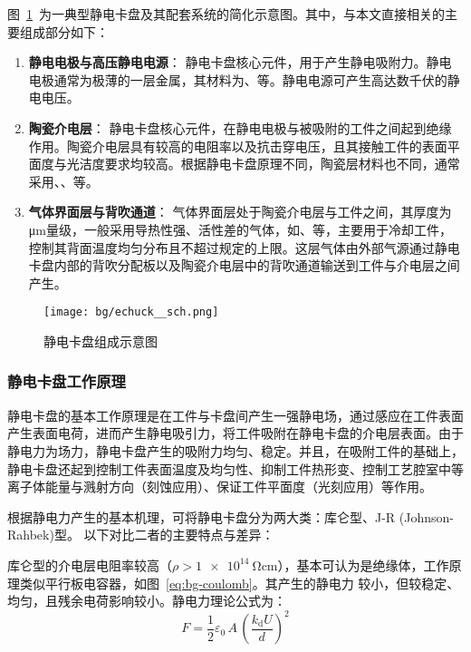 图~\ref{fig:bg-echuck-sch}~为一典型静电卡盘及其配套系统的简化示意图。其中，与本文直接相关的主要组成部分如下：

\begin{enumerate}
  \item \textbf{静电电极与高压静电电源}：
    静电卡盘核心元件，用于产生静电吸附力。静电电极通常为极薄的一层金属，其材料为、等。静电电源可产生高达数千伏的静电电压。
  \item \textbf{陶瓷介电层}：
    静电卡盘核心元件，在静电电极与被吸附的工件之间起到绝缘作用。陶瓷介电层具有较高的电阻率以及抗击穿电压，且其接触工件的表面平面度与光洁度要求均较高。根据静电卡盘原理不同，陶瓷层材料也不同，通常采用、、等。
  \item \textbf{气体界面层与背吹通道}：
    气体界面层处于陶瓷介电层与工件之间，其厚度为\si{\um}量级，一般采用导热性强、活性差的气体，如、等，主要用于冷却工件，控制其背面温度均匀分布且不超过规定的上限。这层气体由外部气源通过静电卡盘内部的背吹分配板以及陶瓷介电层中的背吹通道输送到工件与介电层之间产生。
\end{enumerate}

\begin{figure}[tb]
\centering
\texttt{[image: bg/echuck\_\_sch.png]}
\caption{静电卡盘组成示意图}
\label{fig:bg-echuck-sch}
\end{figure}

\subsubsection{静电卡盘工作原理}\label{sec:bg-bg-chuck-principle}

静电卡盘的基本工作原理是在工件与卡盘间产生一强静电场，通过感应在工件表面产生表面电荷，进而产生静电吸引力，将工件吸附在静电卡盘的介电层表面。由于静电力为场力，静电卡盘产生的吸附力均匀、稳定。并且，在吸附工件的基础上，静电卡盘还起到控制工件表面温度及均匀性、抑制工件热形变、控制工艺腔室中等离子体能量与溅射方向（刻蚀应用）、保证工件平面度（光刻应用）等作用。

根据静电力产生的基本机理，可将静电卡盘分为两大类：库仑型、\mbox{J-R} (Johnson-Rahbek)型。 以下对比二者的主要特点与差异：

库仑型的介电层电阻率较高（$\rho > \SI{1e14}{\ohm\cm}$），基本可认为是绝缘体，工作原理类似平行板电容器，如图~\ref{eq:bg-coulomb}。其产生的静电力 较小，但较稳定、均匀，且残余电荷影响较小。静电力理论公式为：
\begin{equation}
\label{eq:bg-coulomb}
F = \frac{1}{2} {\varepsilon}_0 \, A \, {\left( \frac{k_{\mathrm{d}} U}{d} \right)}^2
\end{equation}

